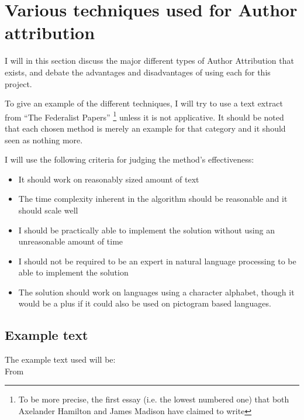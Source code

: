 \section{Various techniques used for Author attribution}
\label{choiceMethod}
I will in this section discuss the major different types of Author Attribution that exists, and debate the advantages and disadvantages of using each for this project.

To give an example of the different techniques, I will try to use a text extract from ``The Federalist Papers'' \cite{federalist} \footnote{To be more precise, the first essay (i.e. the lowest numbered one) that both Axelander Hamilton and James Madison have claimed to write} unless it is not applicative. It should be noted that each chosen method is merely an example for that category and it should seen as nothing more.

I will use the following criteria for judging the method's effectiveness:
\begin{itemize}
\item It should work on reasonably sized amount of text
\item The time complexity inherent in the algorithm should be reasonable and it should scale well
\item I should be practically able to implement the solution without using an unreasonable amount of time
\item I should not be required to be an expert in natural language processing to be able to implement the solution
\item The solution should work on languages using a character alphabet, though it would be a plus if it could also be used on pictogram based languages.
\end{itemize}

\subsection{Example text}
The example text used will be:\\
From \cite{federalist}

